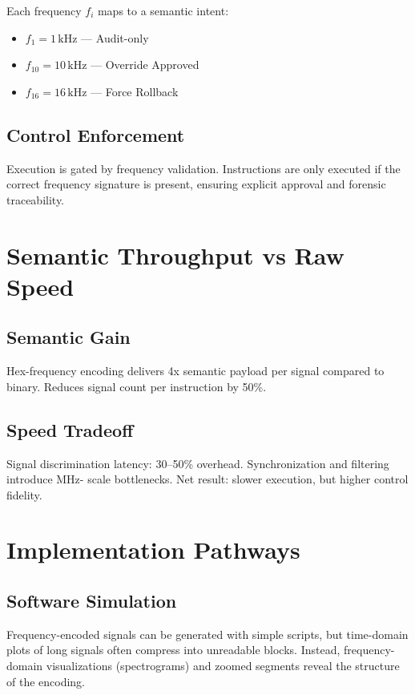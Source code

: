 \documentclass[11pt]{article}
\begin{document}
Each frequency $f_i$ maps to a semantic intent:
\begin{itemize}
  \item $f_1 = 1 \,\text{kHz}$ — Audit-only
  \item $f_{10} = 10 \,\text{kHz}$ — Override Approved
  \item $f_{16} = 16 \,\text{kHz}$ — Force Rollback
\end{itemize}

\subsection{Control Enforcement}
Execution is gated by frequency validation. Instructions are only executed if the correct frequency
signature is present, ensuring explicit approval and forensic traceability.

\section{Semantic Throughput vs Raw Speed}

\subsection{Semantic Gain}
Hex-frequency encoding delivers 4x semantic payload per signal compared to binary. Reduces signal
count per instruction by 50\%.

\subsection{Speed Tradeoff}
Signal discrimination latency: 30–50\% overhead. Synchronization and filtering introduce MHz-
scale bottlenecks. Net result: slower execution, but higher control fidelity.

\section{Implementation Pathways}

\subsection{Software Simulation}
Frequency-encoded signals can be generated with simple scripts, but time-domain plots of long signals
often compress into unreadable blocks. Instead, frequency-domain visualizations (spectrograms) and
zoomed segments reveal the structure of the encoding.
\end{document}
